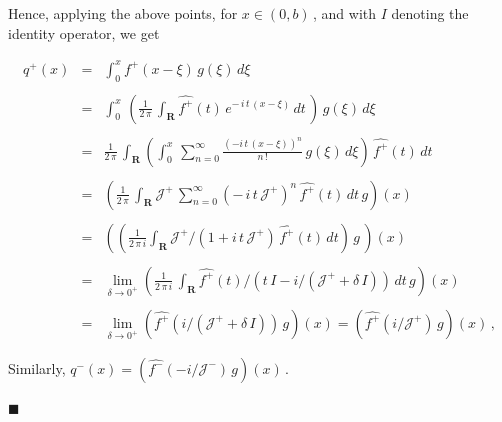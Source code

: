 \documentclass[10pt,a4paper]{amsart}
\begin{document}
\begin{Proof}
\begin{itemize}
 \end{itemize}       

\noindent Hence, applying the above points, for $x \in (0,b)$\,, and with $I$
denoting the identity operator, we get

\begin{equation}
  \begin{array}{rcl}
q^+(x) & = & \displaystyle \int_0^x f^+(x-\xi) \, g(\xi) \, d\xi \\
    && \\
    & = & \displaystyle \int_0^x \,\left(\frac{1}{2\,\pi} \, \int_{\mathbf R}
\widehat{f^+}(t) \, e^{-\,i\,t\,(x - \xi)}\,dt \,
\right)\,g(\xi)\,d\xi \\  
&& \\
& = & \displaystyle \frac{1}{2\,\pi} \,\int_{\mathbf R} \left(\int_0^x
\,\sum_{n=0}^\infty  
         \frac{(-i\,t\,(x-\xi))^n}{n\,!} \, 
         g(\xi)\,d\xi\right) \, \widehat{f^+}(t) \, dt \\ 
         && \\
& = & \displaystyle \left(\frac{1}{2\,\pi} \, \int_{\mathbf R}
         {\mathcal J}^+ \, 
         \sum_{n=0}^\infty \left(-\,i\,t\,{\mathcal J}^+\right)^n \,
         \widehat{f^+}(t) \, dt \, g\right)(x) \\ 
         && \\
& = & \displaystyle \left(\left(\frac{1}{2\,\pi\,i} \int_{\mathbf R} {\mathcal
           J}^+/\left(1 + i\,t\,{\mathcal J}^+\right) \,
         \widehat{f^+}(t) 
         \, dt\right) \, g \, \right)(x) \\
&& \\
     & = & \displaystyle \lim_{\delta \to 0^+}\left(\frac{1}{2\,\pi\,i}\,\int_{\mathbf R}
      \widehat{f^+}(t)/\left(t\,I - i/\left({\mathcal
          J}^++\delta\,I\right)\right) \, dt \, 
      g\right)(x) \\ 
      && \\
      & = & \displaystyle \lim_{\delta \to 0^+}
      \left(\widehat{f^+}\left(i/\left({\mathcal J}^+ +
      \delta\,I\right)\right)\,g\right)(x) = 
      \left(\widehat{f^+}\left(i/{\mathcal J}^+\right)\,g\right)(x)\,,
  \end{array}
      \label{equation:2.12}
\end{equation} 

\noindent Similarly, $q^-(x) = \left(\widehat{f^-}\left(-i/{\mathcal
  J}^-\right)\,g\right)(x)$\,.  
  \end{Proof} $\blacksquare$
\end{document}
